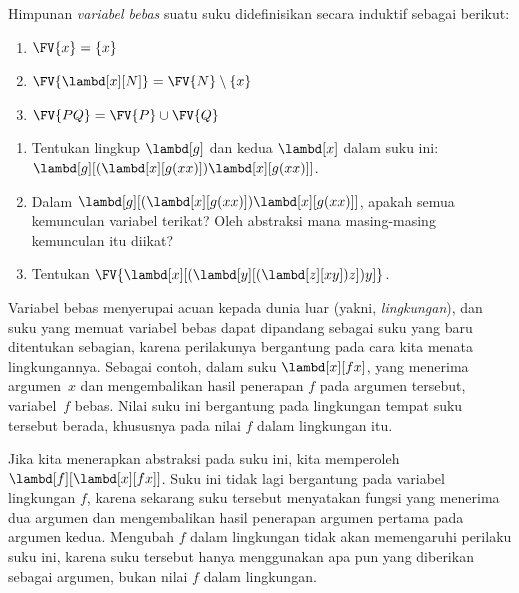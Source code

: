 \documentclass[../../../include/open-logic-section]{subfiles}
\begin{document}
\begin{defn} 
  Himpunan \emph{variabel bebas} suatu suku didefinisikan secara induktif
  sebagai berikut:
  \begin{enumerate}
    \item $\FV{x} = \{x\}$ 
    \item $\FV{\lambd[x][N]} = \FV{N} \setminus \{x\}$    
    \item $\FV{PQ} = \FV{P} \cup \FV{Q}$ 
  \end{enumerate}
\end{defn}

\begin{prob}
  \begin{enumerate}
  \item Tentukan lingkup $\lambd[g]$ dan kedua $\lambd[x]$ dalam suku ini:
    $\lambd[g][(\lambd[x][g (x x)]) \lambd[x][g (x x)]]$.
  \item Dalam $\lambd[g][(\lambd[x][g (x x)]) \lambd[x][g (x x)]]$,
    apakah semua kemunculan variabel terikat? Oleh abstraksi mana masing-masing
    kemunculan itu diikat?
    \item Tentukan $\FV{\lambd[x][(\lambd[y][(\lambd[z][x y]) z]) y]}$.
  \end{enumerate}
\end{prob}

\begin{explain}
Variabel bebas menyerupai acuan kepada dunia luar (yakni,
\emph{lingkungan}), dan suku yang memuat variabel bebas dapat dipandang
sebagai suku yang baru ditentukan sebagian, karena perilakunya bergantung pada
cara kita menata lingkungannya. Sebagai contoh, dalam suku $\lambd[x][f x]$,
yang menerima argumen~$x$ dan mengembalikan hasil penerapan $f$ pada argumen
tersebut, variabel~$f$ bebas. Nilai suku ini bergantung pada lingkungan tempat
suku tersebut berada, khususnya pada nilai $f$ dalam lingkungan itu.

Jika kita menerapkan abstraksi pada suku ini, kita memperoleh
$\lambd[f][\lambd[x][f x]]$. Suku ini tidak lagi bergantung pada variabel
lingkungan $f$, karena sekarang suku tersebut menyatakan fungsi yang menerima
dua argumen dan mengembalikan hasil penerapan argumen pertama pada argumen
kedua. Mengubah $f$ dalam lingkungan tidak akan memengaruhi perilaku suku ini,
karena suku tersebut hanya menggunakan apa pun yang diberikan sebagai
argumen, bukan nilai $f$ dalam lingkungan.
\end{explain}
\end{document}
